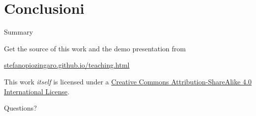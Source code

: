 \documentclass[10pt]{beamer}
\begin{document}
	\section{Conclusioni}

	\begin{frame}{Summary}

	  Get the source of this work and the demo presentation from

	  \begin{center}\url{stefanopiozingaro.github.io/teaching.html}\end{center}

	  This work \emph{itself} is licensed under a
	  \href{http://creativecommons.org/licenses/by-sa/4.0/}{Creative Commons
	  Attribution-ShareAlike 4.0 International License}.

	  \begin{center}\ccbysa\end{center}

	\end{frame}

	\begin{frame}[standout]
	  Questions?
	\end{frame}

	\appendix
\end{document}
